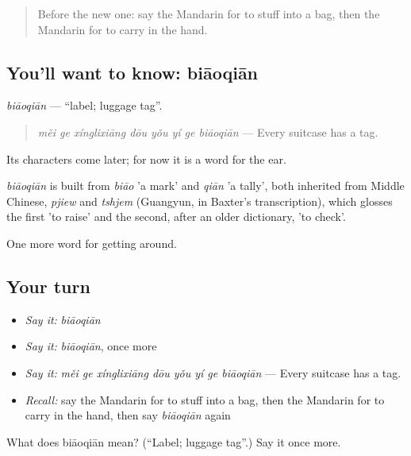 \begin{quote}
Before the new one: say the Mandarin for to stuff into a bag, then the Mandarin for to carry in the hand.
\end{quote}

\subsection*{You'll want to know: biāoqiān}
\emph{biāoqiān} — \textquotedblleft{}label; luggage tag\textquotedblright{}.

\begin{quote}
\emph{měi ge xínglixiāng dōu yǒu yí ge biāoqiān} — Every suitcase has a tag.
\end{quote}

Its characters come later; for now it is a word for the ear.

\begin{cousinweb}
\emph{biāoqiān} is built from \emph{biāo} 'a mark' and \emph{qiān} 'a tally', both inherited from Middle Chinese, \emph{pjiew} and \emph{tshjem} (Guangyun, in Baxter's transcription), which glosses the first 'to raise' and the second, after an older dictionary, 'to check'.
\end{cousinweb}

\begin{grammarlens}[title={What you've built}]
One more word for getting around.
\end{grammarlens}

\subsection*{Your turn}
\begin{itemize}
\raggedright
  \item \emph{Say it:} \emph{biāoqiān}
  \item \emph{Say it:} \emph{biāoqiān}, once more
  \item \emph{Say it:} \emph{měi ge xínglixiāng dōu yǒu yí ge biāoqiān} — Every suitcase has a tag.
  \item \emph{Recall:} say the Mandarin for to stuff into a bag, then the Mandarin for to carry in the hand, then say \emph{biāoqiān} again
\end{itemize}

\begin{tcolorbox}[breakable,colback=teal!4,colframe=teal!35!black,title={Before you move on}]
What does biāoqiān mean? (\textquotedblleft{}Label; luggage tag\textquotedblright{}.) Say it once more.
\end{tcolorbox}
